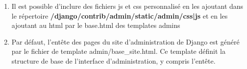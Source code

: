 \documentclass[11pt,a4paper]{article}
\begin{document}
\begin{enumerate}
		\item Il est possible d'inclure des fichiers js et css personnalisé en les ajoutant dans le répertoire \textbf{/django/contrib/admin/static/admin/css|js} et en les ajoutant au html par le base.html des templates admins
		\item Par défaut, l'entête des pages du site d'administration de Django est généré par le fichier de template admin/base\_site.html. Ce template définit la structure de base de l'interface d'administration, y compris l'entête.
\end{enumerate}
\end{document}
